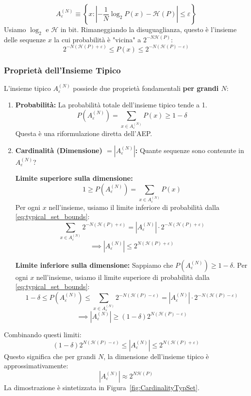 \begin{enumerate}
$$ A_\varepsilon^{(N)} \equiv \left\{ x : \left| -\frac{1}{N} \log_2 P(x) - \mathcal{H}(P) \right| \leq \varepsilon \right\} $$
Usiamo $\log_2$ e $\mathcal{H}$ in bit.
Rimaneggiando la disuguaglianza, questo è l'insieme delle sequenze $x$ la cui probabilità è "vicina" a $2^{-N\mathcal{H}(P)}$:
\begin{equation}
    2^{-N(\mathcal{H}(P) + \varepsilon)} \leq P(x) \leq 2^{-N(\mathcal{H}(P) - \varepsilon)}
    \label{eq:typical_set_bounds}
\end{equation}

\subsubsection{Proprietà dell'Insieme Tipico}
L'insieme tipico $A_\varepsilon^{(N)}$ possiede due proprietà fondamentali \textbf{per grandi $N$}:

\begin{enumerate}
    \item \textbf{Probabilità:} La probabilità totale dell'insieme tipico tende a 1.
    $$ P(A_\varepsilon^{(N)}) = \sum_{x \in A_\varepsilon^{(N)}} P(x) \ge 1 - \delta $$
    Questa è una riformulazione diretta dell'AEP.

    \item \textbf{Cardinalità (Dimensione) $=\left|A_\varepsilon^{(N)}\right|$:} Quante sequenze sono contenute in $A_\varepsilon^{(N)}$?
    
    \textbf{Limite superiore sulla dimensione:}
    $$ 1 \ge P(A_\varepsilon^{(N)}) = \sum_{x \in A_\varepsilon^{(N)}} P(x) $$
    Per ogni $x$ nell'insieme, usiamo il limite inferiore di probabilità dalla \eqref{eq:typical_set_bounds}:
    $$ \sum_{x \in A_\varepsilon^{(N)}} 2^{-N(\mathcal{H}(P) + \varepsilon)} = |A_\varepsilon^{(N)}| \cdot 2^{-N(\mathcal{H}(P) + \varepsilon)} $$
    $$ \implies |A_\varepsilon^{(N)}| \leq 2^{N(\mathcal{H}(P) + \varepsilon)} $$

    \textbf{Limite inferiore sulla dimensione:}
    Sappiamo che $P(A_\varepsilon^{(N)}) \ge 1 - \delta$. Per ogni $x$ nell'insieme, usiamo il limite superiore di probabilità dalla \eqref{eq:typical_set_bounds}:
    $$ 1 - \delta \leq P(A_\varepsilon^{(N)}) \leq \sum_{x \in A_\varepsilon^{(N)}} 2^{-N(\mathcal{H}(P) - \varepsilon)} = |A_\varepsilon^{(N)}| \cdot 2^{-N(\mathcal{H}(P) - \varepsilon)} $$
    $$ \implies |A_\varepsilon^{(N)}| \ge (1 - \delta) 2^{N(\mathcal{H}(P) - \varepsilon)} $$
\end{enumerate}
Combinando questi limiti:
$$ (1 - \delta) 2^{N(\mathcal{H}(P) - \varepsilon)} \leq |A_\varepsilon^{(N)}| \leq 2^{N(\mathcal{H}(P) + \varepsilon)} $$
Questo significa che per grandi $N$, la dimensione dell'insieme tipico è approssimativamente:
\begin{equation}
    |A_\varepsilon^{(N)}| \approx 2^{N\mathcal{H}(P)}
    \label{eq:typical_set_size}
\end{equation}
La dimostrazione è sintetizzata in Figura~\ref{fig:CardinalityTypSet}.



\end{enumerate}
